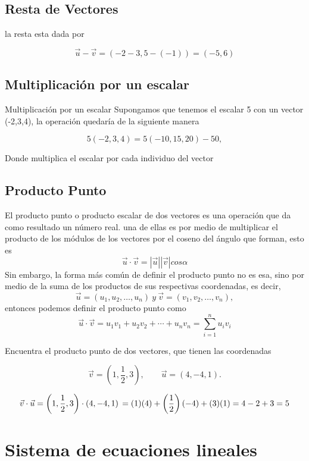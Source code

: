 \documentclass{article}
\begin{document}
\subsection{Resta de Vectores}
la resta esta dada por

\[
\vec{u} - \vec{v} = (-2 - 3, 5 - (-1)) = (-5,6)
\]

\subsection{Multiplicación por un escalar}
Multiplicación por un escalar
Supongamos que tenemos el escalar 5
con un vector (-2,3,4), la operación quedaría de la siguiente manera

\[
    5 (-2, 3, 4) = 5 (-10, 15, 20)
    -50,
\]

Donde multiplica el escalar por cada individuo del vector

\subsection{Producto Punto}
El producto punto o producto escalar de dos vectores es una operación que da como resultado un número real.
una de ellas es por medio de multiplicar el producto de los módulos de los vectores por el coseno del ángulo que forman, esto es
\[
    \vec{u} \cdot \vec{v} = | \vec{u}| | \vec{v}| cos \alpha
\]
Sin embargo, la forma más común de definir el producto punto no es esa,
 sino por medio de la suma de los productos de sus respectivas coordenadas,
  es decir,
  \[
  \vec{u} = (u_1, u_2, \dots, u_n) \: y \: \vec{v} = (v_1, v_2, \dots, v_n),
  \]
  entonces podemos definir el producto punto como
  \[
  \displaystyle \vec{u} \cdot \vec{v} = u_1v_1 + u_2v_2 + \cdots + u_nv_n = \sum_{i=1}^{n}{u_iv_i}
  \]

  Encuentra el producto punto de dos vectores, que tienen las coordenadas

  \[
    \displaystyle \vec{v} = \left( 1, \frac{1}{2}, 3\right), \qquad \vec{u} = \left(4, -4, 1\right).
    \]

    \[
         \vec{v} \cdot \vec{u} = \left( 1, \frac{1}{2}, 3\right) \cdot \left(4, -4, 1\right)\\ = (1)(4) + \left( \frac{1}{2}\right) (-4) + (3)(1)\\ = 4 - 2 + 3\\ = 5
    \]

\section{Sistema de ecuaciones lineales}
\end{document}
